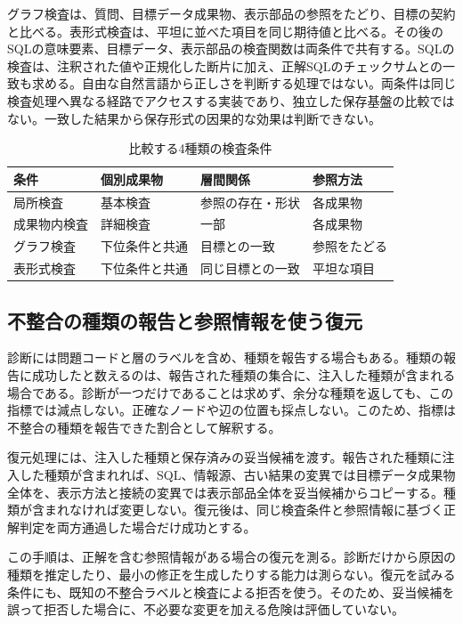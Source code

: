 \documentclass[manuscript,review,anonymous]{acmart}
\newcommand{\condition}[1]{\textsf{#1}}
\begin{document}
\condition{グラフ検査}は、質問、目標データ成果物、表示部品の参照をたどり、目標の契約と比べる。\condition{表形式検査}は、平坦に並べた項目を同じ期待値と比べる。その後のSQLの意味要素、目標データ、表示部品の検査関数は両条件で共有する。SQLの検査は、注釈された値や正規化した断片に加え、正解SQLのチェックサムとの一致も求める。自由な自然言語から正しさを判断する処理ではない。両条件は同じ検査処理へ異なる経路でアクセスする実装であり、独立した保存基盤の比較ではない。一致した結果から保存形式の因果的な効果は判断できない。

\begin{table}[t]
  \caption{比較する4種類の検査条件}
  \label{tab:conditions}
  \begin{tabularx}{\linewidth}{lYYY}
    \toprule
    条件 & 個別成果物 & 層間関係 & 参照方法 \\
    \midrule
    局所検査 & 基本検査 & 参照の存在・形状 & 各成果物 \\
    成果物内検査 & 詳細検査 & 一部 & 各成果物 \\
    グラフ検査 & 下位条件と共通 & 目標との一致 & 参照をたどる \\
    表形式検査 & 下位条件と共通 & 同じ目標との一致 & 平坦な項目 \\
    \bottomrule
  \end{tabularx}
\end{table}

\subsection{不整合の種類の報告と参照情報を使う復元}

診断には問題コードと層のラベルを含め、種類を報告する場合もある。種類の報告に成功したと数えるのは、報告された種類の集合に、注入した種類が含まれる場合である。診断が一つだけであることは求めず、余分な種類を返しても、この指標では減点しない。正確なノードや辺の位置も採点しない。このため、指標は不整合の種類を報告できた割合として解釈する。

復元処理には、注入した種類と保存済みの妥当候補を渡す。報告された種類に注入した種類が含まれれば、SQL、情報源、古い結果の変異では目標データ成果物全体を、表示方法と接続の変異では表示部品全体を妥当候補からコピーする。種類が含まれなければ変更しない。復元後は、同じ検査条件と参照情報に基づく正解判定を両方通過した場合だけ成功とする。

この手順は、正解を含む参照情報がある場合の復元を測る。診断だけから原因の種類を推定したり、最小の修正を生成したりする能力は測らない。復元を試みる条件にも、既知の不整合ラベルと検査による拒否を使う。そのため、妥当候補を誤って拒否した場合に、不必要な変更を加える危険は評価していない。
\end{document}
